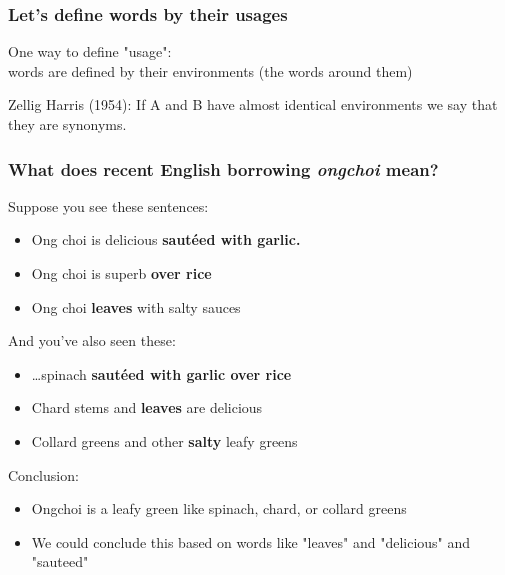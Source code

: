 \documentclass[13.5pt,aspecratio=169, xcolor=dvipsnames]{beamer}
\begin{document}
            \begin{frame}
                \onehalfspacing
                    \frametitle{Let's define words by their usages}
                    {\large
                    One way to define "usage": \\

                    words are defined by their environments (the words around them)
                    
                    \vspace{1em}
                    
                        \begin{block}{Zellig Harris (1954):}
                            If A and B have almost identical environments we say that they
                            are synonyms.
                        \end{block}
                     }       
                \end{frame}

\begin{frame}
    \onehalfspacing
        \frametitle{What does recent English borrowing \textit{ongchoi} mean?}
        Suppose you see these sentences:
        \begin{itemize}
            \item  Ong choi is delicious \textbf{sautéed with garlic.}
            \item Ong choi is superb \textbf{over rice}
            \item Ong choi \textbf{leaves} with salty sauces
        \end{itemize}

        And you've also seen these:
        \begin{itemize}
            \item …spinach \textbf{sautéed with garlic over rice}
            \item Chard stems and \textbf{leaves} are delicious
            \item Collard greens and other \textbf{salty} leafy greens
        \end{itemize}
        \begin{block}{Conclusion:}
            \begin{itemize}
                \item Ongchoi is a leafy green like spinach, chard, or collard greens
                \item We could conclude this based on words like "leaves" and "delicious" and "sauteed"
            \end{itemize}
        \end{block}
    \end{frame}
\end{document}
